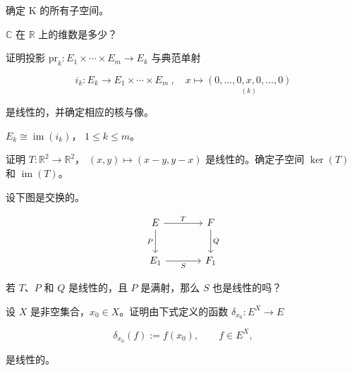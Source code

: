 \begin{exercises}
\item

\begin{items}
\item

确定 K 的所有子空间。

\item

$ \mathbb{C} $ 在  $ \mathbb{R} $ 上的维数是多少？

\end{items}

\item

\begin{items}
\item

证明投影  $ \mathrm{pr}_{k}: E_{1} \times \cdots \times E_{m} \to E_{k} $ 与典范单射

\[
i_{k}\colon E_{k}\to E_{1}\times\cdots\times E_{m}~,\quad x\mapsto\underset{(k)}{(0,\ldots,0,x,0,\ldots,0)}
\]

是线性的，并确定相应的核与像。

\item

\proofhead
$ E_k \cong \operatorname{im}(i_k) $， $ 1 \leq k \leq m $。
\end{items}

\item

证明  $ T: \mathbb{R}^2 \to \mathbb{R}^2 $， $ (x, y) \mapsto (x - y, y - x) $ 是线性的。确定子空间  $ \ker(T) $ 和  $ \operatorname{im}(T) $。

\item

设下图是交换的。

\[
\begin{tikzcd}[row sep=2.4em, column sep=3.6em]
E \arrow[r, "T"] \arrow[d, "P"'] & F \arrow[d, "Q"] \\
E_{1} \arrow[r, "S"'] & F_{1}
\end{tikzcd}
\]

若 $T$、$P$ 和 $Q$ 是线性的，且 $P$ 是满射，那么 $S$ 也是线性的吗？

\item

设 $X$ 是非空集合，$x_0 \in X$。证明由下式定义的函数 $\delta_{x_0} : E^X \to E$

\[
\delta_{x_{0}}(f):=f(x_{0}),\qquad f\in E^{X},
\]

是线性的。


\end{exercises}
